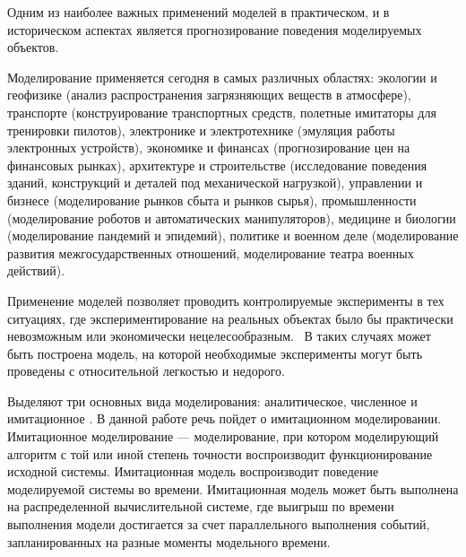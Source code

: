 Одним из наиболее важных применений моделей в практическом, и в историческом аспектах является прогнозирование поведения моделируемых объектов.

Моделирование применяется сегодня в самых различных областях: экологии и геофизике (анализ распространения загрязняющих веществ в атмосфере), транспорте (конструирование транспортных средств, полетные имитаторы для тренировки пилотов), электронике и электротехнике (эмуляция работы электронных устройств), экономике и финансах (прогнозирование цен на финансовых рынках), архитектуре и строительстве (исследование поведения зданий, конструкций и деталей под механической нагрузкой), управлении и бизнесе (моделирование рынков сбыта и рынков сырья), промышленности (моделирование роботов и автоматических манипуляторов), медицине и биологии (моделирование пандемий и эпидемий), политике и военном деле (моделирование развития межгосударственных отношений, моделирование театра военных действий).

Применение моделей позволяет проводить контролируемые эксперименты в тех ситуациях, где экспериментирование на реальных объектах было бы практически невозможным или экономически нецелесообразным.~\cite{Shennon} В таких случаях может быть построена модель, на которой необходимые эксперименты могут быть проведены с относительной легкостью и недорого.



Выделяют три основных вида моделирования: аналитическое, численное и имитационное \cite{disksobmod}. В данной работе речь пойдет о имитационном моделировании. Имитационное моделирование --- моделирование, при котором моделирующий алгоритм с той или иной степень точности воспроизводит функционирование исходной системы. Имитационная модель воспроизводит поведение моделируемой системы во времени. Имитационная модель может быть выполнена на распределенной вычислительной системе, где выигрыш по времени выполнения модели достигается за счет параллельного выполнения событий, запланированных на разные моменты модельного времени.

